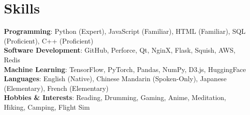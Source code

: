 \section{Skills}
 \begin{itemize}[leftmargin=0.5cm, label={}]
    \small{\item{
     \textbf{Programming}{: Python (Expert), JavaScript (Familiar), HTML (Familiar), SQL (Proficient), C++ (Proficient)} \\
     \textbf{Software Development}{: GitHub, Perforce, Qt, NginX, Flask, Squish, AWS, Redis} \\
     \textbf{Machine Learning}{: TensorFlow, PyTorch, Pandas, NumPy, D3.js, HuggingFace} \\
     \textbf{Languages}{: English (Native), Chinese Mandarin (Spoken-Only), Japanese (Elementary), French (Elementary)} \\
     \textbf{Hobbies \& Interests}{: Reading, Drumming, Gaming, Anime, Meditation, Hiking, Camping, Flight Sim} \\
    }}
 \end{itemize}